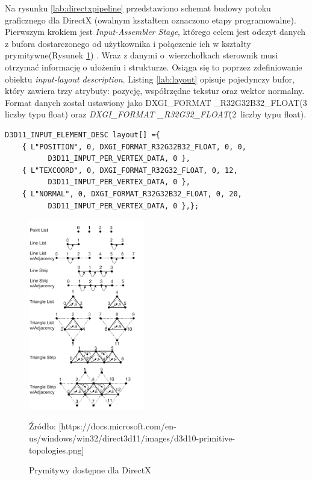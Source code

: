 \documentclass[archive]{mgr}
\begin{document}
Na rysunku \ref{lab:directxpipeline} przedstawiono schemat budowy potoku graficznego dla DirectX (owalnym kształtem oznaczono etapy programowalne). Pierwszym krokiem jest \emph{Input-Assembler Stage}, którego celem jest odczyt danych z bufora dostarczonego od użytkownika i połączenie ich w kształty prymitywne(Rysunek \ref{lab:directxprimitive}) \cite{DirectXDocumentation}. Wraz z danymi o~wierzchołkach sterownik musi otrzymać informację o ułożeniu i strukturze. Osiąga się to poprzez zdefiniowanie obiektu \emph{input-layout description}. Listing \ref{lab:layout} opisuje pojedynczy bufor, który zawiera trzy atrybuty: pozycję, współrzędne tekstur oraz wektor normalny. Format danych został ustawiony jako DXGI\_FORMAT  \_R32G32B32\_FLOAT(3 liczby typu float) oraz \emph{DXGI\_FORMAT \_R32G32\_FLOAT}(2~liczby typu float).
\newpage
\begin{lstlisting}[caption={Input-layout descriptor - przykład},captionpos=b,label={lab:layout}]
D3D11_INPUT_ELEMENT_DESC layout[] ={
    { L"POSITION", 0, DXGI_FORMAT_R32G32B32_FLOAT, 0, 0, 
          D3D11_INPUT_PER_VERTEX_DATA, 0 },
    { L"TEXCOORD", 0, DXGI_FORMAT_R32G32_FLOAT, 0, 12, 
          D3D11_INPUT_PER_VERTEX_DATA, 0 },
    { L"NORMAL", 0, DXGI_FORMAT_R32G32B32_FLOAT, 0, 20, 
          D3D11_INPUT_PER_VERTEX_DATA, 0 },}; 
\end{lstlisting}

\begin{figure}[h!]
  \centering
    \includegraphics[width=0.45\textwidth]{images/directxprimitives.png}
   \caption{Prymitywy dostępne dla DirectX}
   Źródło: [https://docs.microsoft.com/en-us/windows/win32/direct3d11/images/d3d10-primitive-topologies.png]
   \label{lab:directxprimitive}
\end{figure}
\end{document}

